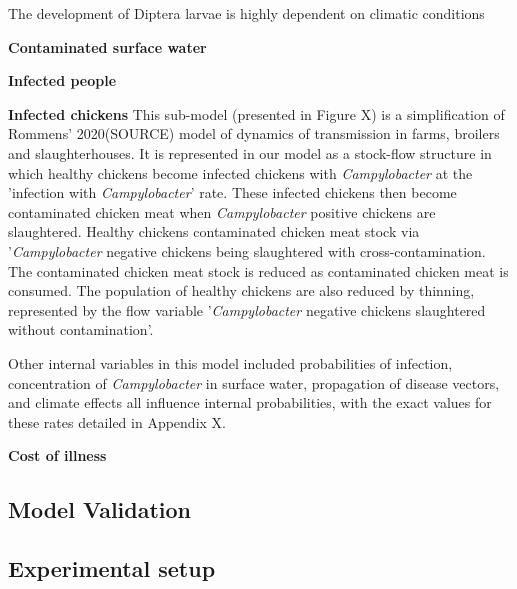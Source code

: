 The development of Diptera larvae is highly dependent on climatic conditions

\textbf{Contaminated surface water}

\textbf{Infected people}

\textbf{Infected chickens}
This sub-model (presented in Figure X) is a simplification of Rommens' 2020(SOURCE) model of dynamics of transmission in farms, broilers and slaughterhouses. It is represented in our model as a stock-flow structure in which healthy chickens become infected chickens with \textit{Campylobacter} at the 'infection with \textit{Campylobacter}' rate. These infected chickens then become contaminated chicken meat when \textit{Campylobacter} positive chickens are slaughtered. Healthy chickens  contaminated chicken meat stock via '\textit{Campylobacter} negative chickens being slaughtered with cross-contamination. The contaminated chicken meat stock is reduced as contaminated chicken meat is consumed. The population of healthy chickens are also reduced by thinning, represented by the flow variable '\textit{Campylobacter} negative chickens slaughtered without contamination'.

Other internal variables in this model included probabilities of infection, concentration of \textit{Campylobacter} in surface water, propagation of disease vectors, and climate effects all influence internal probabilities, with the exact values for these rates detailed in Appendix X.


\textbf{Cost of illness}

\subsection{Model Validation}
    
\subsection{Experimental setup}



